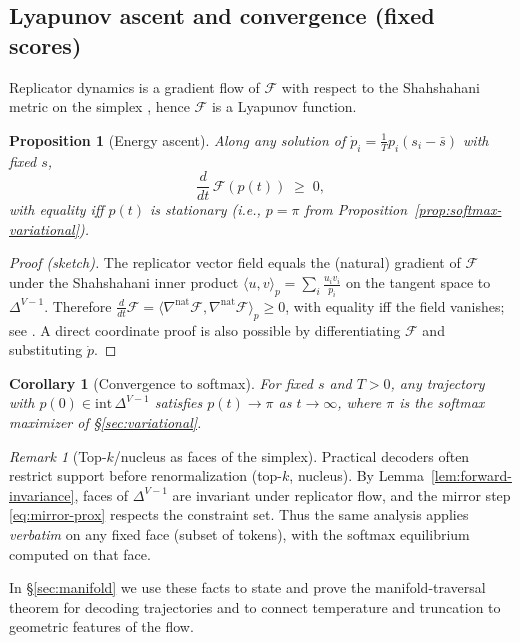 \documentclass[10pt,a4paper]{amsart}
\numberwithin{equation}{section}
\theoremstyle{plain}
\newtheorem{proposition}[theorem]{Proposition}
\newtheorem{corollary}[theorem]{Corollary}
\theoremstyle{definition}
\theoremstyle{remark}
\newtheorem{remark}[theorem]{Remark}
\newcommand{\1}{\mathbbm{1}}
\newcommand{\simplex}{\Delta^{V-1}}
\newcommand{\avgscore}{\bar{s}}
\begin{document}
\subsection{Lyapunov ascent and convergence (fixed scores)}
Replicator dynamics is a gradient flow of $\mathcal{F}$ with respect to the Shahshahani metric on the simplex \citep{shahshahani1979nouvelle,hofbauer1998evolutionary}, hence $\mathcal{F}$ is a Lyapunov function.

\begin{proposition}[Energy ascent]\label{prop:lyapunov}
Along any solution of $\dot p_i=\tfrac{1}{T}p_i(s_i-\avgscore)$ with fixed $s$,
\[
\frac{d}{dt}\,\mathcal{F}(p(t)) \;\ge\; 0,
\]
with equality iff $p(t)$ is stationary (i.e., $p=\pi$ from Proposition~\ref{prop:softmax-variational}).
\end{proposition}

\begin{proof}[Proof (sketch)]
The replicator vector field equals the (natural) gradient of $\mathcal{F}$ under the Shahshahani inner product
$\langle u,v\rangle_p=\sum_i \tfrac{u_i v_i}{p_i}$ on the tangent space to $\simplex$. Therefore
$\tfrac{d}{dt}\mathcal{F}=\langle \nabla^{\text{nat}}\mathcal{F},\nabla^{\text{nat}}\mathcal{F}\rangle_p\ge 0$,
with equality iff the field vanishes; see \citet{shahshahani1979nouvelle,hofbauer1998evolutionary}.
A direct coordinate proof is also possible by differentiating $\mathcal{F}$ and substituting $\dot p$.
\end{proof}

\begin{corollary}[Convergence to softmax]\label{cor:convergence}
For fixed $s$ and $T>0$, any trajectory with $p(0)\in\mathrm{int}\,\simplex$ satisfies $p(t)\to \pi$ as $t\to\infty$, where $\pi$ is the softmax maximizer of \S\ref{sec:variational}.
\end{corollary}

\begin{remark}[Top-$k$/nucleus as faces of the simplex]
Practical decoders often restrict support before renormalization (top-$k$, nucleus). By Lemma~\ref{lem:forward-invariance}, faces of $\simplex$ are invariant under replicator flow, and the mirror step \eqref{eq:mirror-prox} respects the constraint set. Thus the same analysis applies \emph{verbatim} on any fixed face (subset of tokens), with the softmax equilibrium computed on that face.
\end{remark}

\medskip
In \S\ref{sec:manifold} we use these facts to state and prove the manifold-traversal theorem for decoding trajectories and to connect temperature and truncation to geometric features of the flow.
\end{document}
